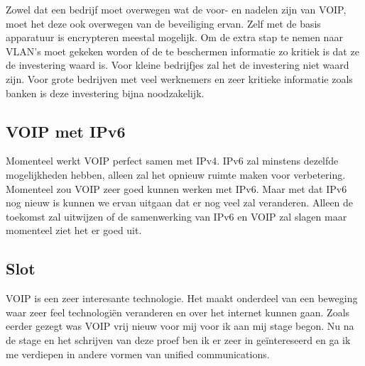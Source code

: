 \documentclass[pdftex,a4paper,12pt,twoside]{report}
\begin{document}
Zowel dat een bedrijf moet overwegen wat de voor- en nadelen zijn van VOIP, moet het deze ook overwegen van de beveiliging ervan. Zelf met de basis apparatuur is encrypteren meestal mogelijk. Om de extra stap te nemen naar VLAN's moet gekeken worden of de te beschermen informatie zo kritiek is dat ze de investering waard is. Voor kleine bedrijfjes zal het de investering niet waard zijn. Voor grote bedrijven met veel werknemers en zeer kritieke informatie zoals banken is deze investering bijna noodzakelijk.
\subsection{VOIP met IPv6}
Momenteel werkt VOIP perfect samen met IPv4. IPv6 zal minstens dezelfde mogelijkheden hebben, alleen zal het opnieuw ruimte maken voor verbetering. Momenteel zou VOIP zeer goed kunnen werken met IPv6. Maar met dat IPv6 nog nieuw is kunnen we ervan uitgaan dat er nog veel zal veranderen. Alleen de toekomst zal uitwijzen of de samenwerking van IPv6 en VOIP zal slagen maar momenteel ziet het er goed uit.
\subsection{Slot}
VOIP is een zeer interesante technologie. Het maakt onderdeel van een beweging waar zeer feel technologiën veranderen en over het internet kunnen gaan. Zoals eerder gezegt was VOIP vrij nieuw voor mij voor ik aan mij stage begon. Nu na de stage en het schrijven van deze proef ben ik er zeer in geïntereseerd en ga ik me verdiepen in andere vormen van unified communications.








\listoffigures
\end{document}
